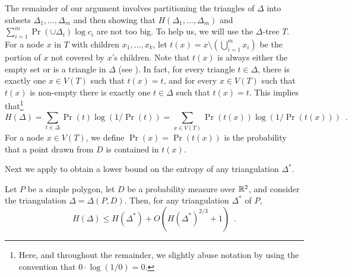 \documentclass[lotsofwhite]{patmorin}
\begin{document}
The remainder of our argument involves partitioning the triangles of
$\Delta$ into subsets $\Delta_1,\ldots,\Delta_m$ and then showing that
$H(\Delta_1,\ldots,\Delta_m)$ and $\sum_{i=1}^m \Pr(\cup\Delta_i)\log
c_i$ are not too big.  To help us, we will use the $\Delta$-tree $T$.
For a node $x$ in $T$ with children $x_1,\ldots,x_k$, let $t(x) = x
\setminus (\bigcup_{i=1}^m x_i)$ be the portion of $x$ not covered by
$x$'s children.  Note that $t(x)$ is always either the empty set or is
a triangle in $\Delta$ (see ).  In fact, for every
triangle $t\in\Delta$, there is exactly one $x\in V(T)$ such that
$t(x)=t$, and for every $x\in V(T)$ such that $t(x)$ is non-empty
there is exactly one $t\in\Delta$ such that $t(x)=t$.  This implies
that\footnote{Here, and throughout the remainder, we slightly abuse
notation by using the convention that $0\cdot\log(1/0)=0$.}
\[
    H(\Delta) = \sum_{t\in\Delta}\Pr(t)\log(1/\Pr(t)) =
       \sum_{x\in V(T)}\Pr(t(x))\log(1/\Pr(t(x))) \enspace .
\]
For a node $x\in V(T)$, we define $\Pr(x)=\Pr(t(x))$ is the
probability that a point drawn from $D$ is contained in $t(x)$.

Next we apply  to obtain a lower bound on the
entropy of any triangulation $\Delta^*$. 

\begin{lem}
Let $P$ be a simple polygon, let $D$ be a probability measure over
$\mathbb{R}^2$, and consider the triangulation $\Delta=\Delta(P,D)$.
Then, for any triangulation $\Delta^*$ of $P$,
\[
    H(\Delta) \le H(\Delta^*) + O(H(\Delta^*)^{2/3}+1) \enspace .
\]
\end{lem}
\end{document}
